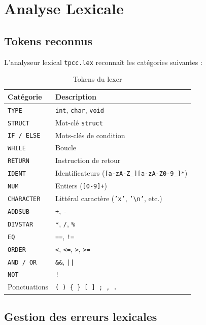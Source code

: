 \documentclass[12pt,a4paper]{article}
\begin{document}
\section{Analyse Lexicale}

\subsection{Tokens reconnus}

L'analyseur lexical \texttt{tpcc.lex} reconnaît les catégories suivantes :

\begin{table}[H]
\centering
\begin{tabularx}{\linewidth}{lX}
\toprule
\textbf{Catégorie} & \textbf{Description} \\
\midrule
\texttt{TYPE}       & \texttt{int}, \texttt{char}, \texttt{void} \\
\texttt{STRUCT}     & Mot-clé \texttt{struct} \\
\texttt{IF / ELSE}  & Mots-clés de condition \\
\texttt{WHILE}      & Boucle \\
\texttt{RETURN}     & Instruction de retour \\
\texttt{IDENT}      & Identificateurs (\texttt{[a-zA-Z\_][a-zA-Z0-9\_]*}) \\
\texttt{NUM}        & Entiers (\texttt{[0-9]+}) \\
\texttt{CHARACTER}  & Littéral caractère (\texttt{'x'}, \texttt{'\textbackslash n'}, etc.) \\
\texttt{ADDSUB}     & \texttt{+}, \texttt{-} \\
\texttt{DIVSTAR}    & \texttt{*}, \texttt{/}, \texttt{\%} \\
\texttt{EQ}         & \texttt{==}, \texttt{!=} \\
\texttt{ORDER}      & \texttt{<}, \texttt{<=}, \texttt{>}, \texttt{>=} \\
\texttt{AND / OR}   & \texttt{\&\&}, \texttt{||} \\
\texttt{NOT}        & \texttt{!} \\
Ponctuations        & \texttt{( ) \{ \} [ ] ; , .} \\
\bottomrule
\end{tabularx}
\caption{Tokens du lexer}
\end{table}

\subsection{Gestion des erreurs lexicales}
\end{document}
